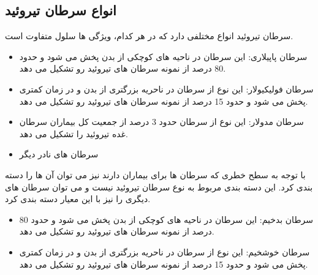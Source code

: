 \subsection{انواع سرطان تیروئید}\label{subsec:انواع-سرطان-تیروئید}

سرطان تیروئید انواع مختلفی دارد که در هر کدام، ویژگی ها سلول متفاوت است.

\begin{itemize}
    \item سرطان پاپیلاری:
    این سرطان در ناحیه های کوچکی از بدن پخش می شود و حدود 80 درصد از نمونه سرطان های تیروئید رو تشکیل می دهد.
    \item سرطان فولیکیولار:
    این نوع از سرطان در ناحریه بزرگتری از بدن و در زمان کمتری پخش می شود و حدود 15 درصد از نمونه سرطان های تیروئید رو تشکیل می دهد.
    \item سرطان مدولار:
    این نوع از سرطان حدود 3 درصد از جمعیت کل بیماران سرطان غده تیروئید را تشکیل می دهد.
    \item سرطان های نادر دیگر
\end{itemize}

با توجه به سطح خطری که سرطان ها برای بیماران دارند نیز می توان آن ها را دسته بندی کرد.
این دسته بندی مربوط به نوع سرطان تیروئید نیست و می توان سرطان های دیگری را نیز با این معیار دسته بندی کرد.
\begin{itemize}
    \item سرطان بدخیم:
    این سرطان در ناحیه های کوچکی از بدن پخش می شود و حدود 80 درصد از نمونه سرطان های تیروئید رو تشکیل می دهد.
    \item سرطان خوشخیم:
    این نوع از سرطان در ناحریه بزرگتری از بدن و در زمان کمتری پخش می شود و حدود 15 درصد از نمونه سرطان های تیروئید رو تشکیل می دهد.
\end{itemize}

\newpage